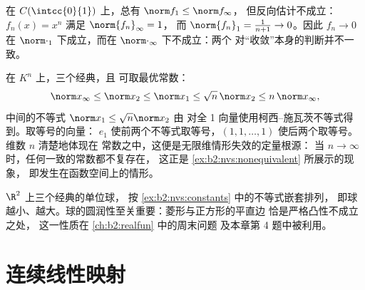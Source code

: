 \begin{example}[无限维中的不等价]\label{ex:b2:nvs:nonequivalent}
在 $C(\intcc{0}{1})$ 上，总有 $\norm f_1 \leq \norm f_\infty$，
但反向估计不成立：$f_n(x) = x^n$ 满足 $\norm{f_n}_\infty = 1$，
而 $\norm{f_n}_1 = \frac{1}{n+1} \to 0$。因此 $f_n \to 0$
在 $\norm\cdot_1$ 下成立，而在 $\norm\cdot_\infty$ 下不成立：两个
对“收敛”本身的判断并不一致。
\end{example}

\begin{example}[$n$ 维中的显式常数]\label{ex:b2:nvs:constants}
在 $K^n$ 上，三个经典，且
可取最优常数：
\[
\norm x_\infty \leq \norm x_2 \leq \norm x_1
\leq \sqrt n\,\norm x_2 \leq n\,\norm x_\infty ,
\]
中间的不等式 $\norm x_1 \leq \sqrt n\norm x_2$ 由
对全 1 向量使用柯西–施瓦茨不等式得到。取等号的向量：
$e_1$ 使前两个不等式取等号，$(1, 1,
\dots, 1)$ 使后两个取等号。维数 $n$ 清楚地体现在
常数之中，这便是无限维情形失效的定量根源：
当 $n \to \infty$ 时，任何一致的常数都不复存在，
这正是 \cref{ex:b2:nvs:nonequivalent} 所展示的现象，
即发生在函数空间上的情形。
\end{example}

\begin{omfigure}

{\small $\R^2$ 上三个经典的单位球，
按 \cref{ex:b2:nvs:constants} 中的不等式嵌套排列，
即球越小、越大。球的圆润性至关重要：菱形与正方形的平直边
恰是严格凸性不成立之处，
这一性质在 \cref{ch:b2:realfun} 中的周末问题
及本章第 4 题中被利用。}
\end{omfigure}

\section{连续线性映射}

